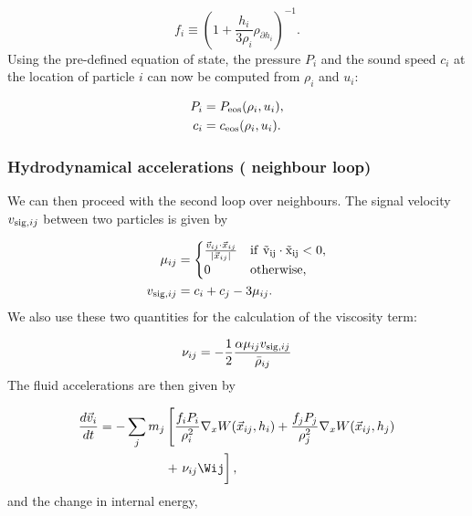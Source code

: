 \begin{equation}
  f_i \equiv \left(1 + \frac{h_i}{3\rho_i}\rho_{\partial h_i}
  \right)^{-1}.
  \label{eq:sph:minimal:f_i}
\end{equation}
Using the pre-defined equation of state, the pressure $P_i$ and the sound
speed $c_i$ at the location of particle $i$ can now be computed from
$\rho_i$ and $u_i$:

\begin{align}
  P_i &= P_{\rm eos}(\rho_i, u_i),   \label{eq:sph:minimal:P}\\
  c_i &= c_{\rm eos}(\rho_i, u_i).   \label{eq:sph:minimal:c}
\end{align}

\subsubsection{Hydrodynamical accelerations ( neighbour loop)}

We can then proceed with the second loop over neighbours. The signal velocity
$v_{{\rm sig},ij}$ between two particles is given by

\begin{align}
  \mu_{ij} &=
  \begin{cases}
  \frac{\vec{v}_{ij} \cdot \vec{x}_{ij}}{|\vec{x}_{ij}|}  & \rm{if}~
  \vec{v}_{ij} \cdot \vec{x}_{ij} < 0,\\
    0 &\rm{otherwise}, \\
  \end{cases}\nonumber\\
  v_{{\rm sig},ij} &= c_i + c_j - 3\mu_{ij}.   \label{eq:sph:minimal:v_sig}
\end{align}
We also use these two quantities for the calculation of the viscosity term:

\begin{equation}
\nu_{ij} = -\frac{1}{2}\frac{\alpha \mu_{ij} v_{{\rm
      sig},ij}}{\bar\rho_{ij}}
  \label{eq:sph:minimal:nu_ij}
\end{equation}
The fluid accelerations are then given by

\begin{align}
  \frac{d\vec{v}_i}{dt} = -\sum_j m_j &\left[\frac{f_iP_i}{\rho_i^2}
  \nabla_x W(\vec{x}_{ij}, h_i)   \nonumber
  +\frac{f_jP_j}{\rho_j^2}\nabla_x W(\vec{x}_{ij},h_j)\right. \\
  &+ \left. \bigg.\nu_{ij} \Wij \right], \label{eq:sph:minimal:dv_dt}
\end{align}
and the change in internal energy,

